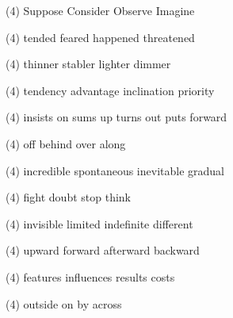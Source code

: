 \item
\begin{tasks}(4)
	\task Suppose
	\task Consider
	\task Observe
	\task Imagine
\end{tasks}
\item
\begin{tasks}(4)
	\task tended
	\task feared
	\task happened
	\task threatened
\end{tasks}
\item
\begin{tasks}(4)
	\task thinner
	\task stabler
	\task lighter
	\task dimmer
\end{tasks}
\item
\begin{tasks}(4)
	\task tendency
	\task advantage
	\task inclination
	\task priority
\end{tasks}
\item
\begin{tasks}(4)
	\task insists on
	\task sums up
	\task turns out
	\task puts forward
\end{tasks}
\item
\begin{tasks}(4)
	\task off
	\task behind
	\task over
	\task along
\end{tasks}
\item
\begin{tasks}(4)
	\task incredible
	\task spontaneous
	\task inevitable
	\task gradual
\end{tasks}
\item
\begin{tasks}(4)
	\task fight
	\task doubt
	\task stop
	\task think
\end{tasks}
\item
\begin{tasks}(4)
	\task invisible
	\task limited
	\task indefinite
	\task different
\end{tasks}
\item
\begin{tasks}(4)
	\task upward
	\task forward
	\task afterward
	\task backward
\end{tasks}
\item
\begin{tasks}(4)
	\task features
	\task influences
	\task results
	\task costs
\end{tasks}
\item
\begin{tasks}(4)
	\task outside
	\task on
	\task by
	\task across
\end{tasks}
\item
